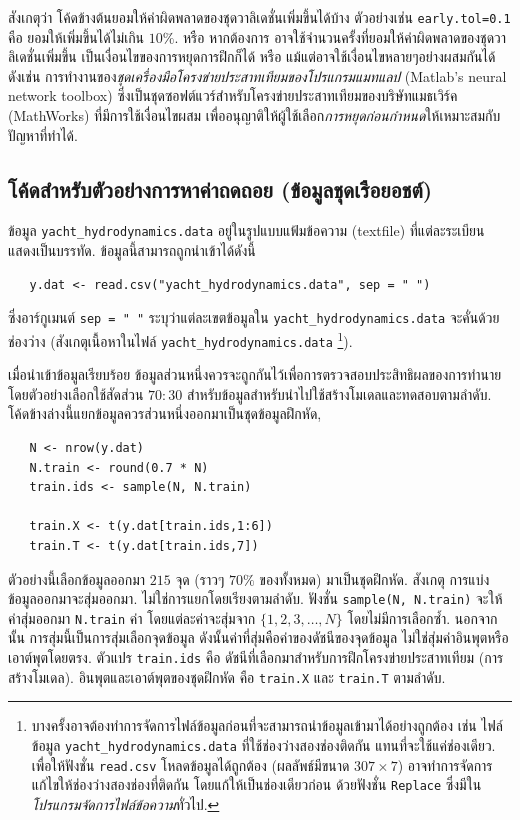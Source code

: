 สังเกตุว่า โค้ดข้างต้นยอมให้ค่าผิดพลาดของชุดวาลิเดชั่นเพิ่มขึ้นได้บ้าง
ตัวอย่างเช่น \texttt{early.tol=0.1} คือ ยอมให้เพิ่มขึ้นได้ไม่เกิน $10\%$.
หรือ หากต้องการ อาจใช้จำนวนครั้งที่ยอมให้ค่าผิดพลาดของชุดวาลิเดชั่นเพิ่มขึ้น เป็นเงื่อนไขของการหยุดการฝึกก็ได้ 
หรือ แม้แต่อาจใช้เงื่อนไขหลายๆอย่างผสมกันได้ ดังเช่น การทำงานของ\textit{ชุดเครื่องมือโครงข่ายประสาทเทียมของโปรแกรมแมทแลป} (Matlab's neural network toolbox) ซึ่งเป็นชุดซอฟต์แวร์สำหรับโครงข่ายประสาทเทียมของบริษัทแมธเวิร์ค (MathWorks) ที่มีการใช้เงื่อนไขผสม 
เพื่ออนุญาติให้ผู้ใช้เลือก\textit{การหยุดก่อนกำหนด}ให้เหมาะสมกับปัญหาที่ทำได้.

\subsection{โค้ดสำหรับตัวอย่างการหาค่าถดถอย (ข้อมูลชุดเรือยอชต์)}
\label{sec: regression example code}

ข้อมูล \texttt{yacht\_hydrodynamics.data} อยู่ในรูปแบบแฟ้มข้อความ (textfile) 
ที่แต่ละระเบียนแสดงเป็นบรรทัด.
ข้อมูลนี้สามารถถูกนำเข้าได้ดังนี้
\begin{verbatim}
   y.dat <- read.csv("yacht_hydrodynamics.data", sep = " ")
\end{verbatim}
ซึ่งอาร์กูเมนต์ \texttt{sep = " "} ระบุว่าแต่ละเขตข้อมูลใน \texttt{yacht\_hydrodynamics.data} จะคั่นด้วยช่องว่าง (สังเกตุเนื้อหาในไฟล์ \texttt{yacht\_hydrodynamics.data}%
\footnote{%
บางครั้งอาจต้องทำการจัดการไฟล์ข้อมูลก่อนที่จะสามารถนำข้อมูลเข้ามาได้อย่างถูกต้อง
เช่น ไฟล์ข้อมูล \texttt{yacht\_hydrodynamics.data} ที่ใช้ช่องว่างสองช่องติดกัน แทนที่จะใช้แค่ช่องเดียว.
เพื่อให้ฟังชั่น \texttt{read.csv} โหลดข้อมูลได้ถูกต้อง (ผลลัพธ์มีขนาด $307 \times 7$)
อาจทำการจัดการแก้ไขให้ช่องว่างสองช่องที่ติดกัน โดยแก้ให้เป็นช่องเดียวก่อน ด้วยฟังชั่น \texttt{Replace} ซึ่งมีใน\textit{โปรแกรมจัดการไฟล์ข้อความ}ทั่วไป.
}).

เมื่อนำเข้าข้อมูลเรียบร้อย ข้อมูลส่วนหนึ่งควรจะถูกกันไว้เพื่อการตรวจสอบประสิทธิผลของการทำนาย 
โดยตัวอย่างเลือกใช้สัดส่วน $70:30$ สำหรับข้อมูลสำหรับนำไปใช้สร้างโมเดลและทดสอบตามลำดับ.
โค้ดข้างล่างนี้แยกข้อมูลควรส่วนหนึ่งออกมาเป็นชุดข้อมูลฝึกหัด,
\begin{verbatim}
   N <- nrow(y.dat)
   N.train <- round(0.7 * N)
   train.ids <- sample(N, N.train)

   train.X <- t(y.dat[train.ids,1:6])
   train.T <- t(y.dat[train.ids,7])
\end{verbatim}
ตัวอย่างนี้เลือกข้อมูลออกมา $215$ จุด (ราวๆ $70\%$ ของทั้งหมด) มาเป็นชุดฝึกหัด.
สังเกตุ การแบ่งข้อมูลออกมาจะสุ่มออกมา. ไม่ใช่การแยกโดยเรียงตามลำดับ.
ฟังชั่น \texttt{sample(N, N.train)} จะให้ค่าสุ่มออกมา \texttt{N.train} ค่า โดยแต่ละค่าจะสุ่มจาก $\{1, 2, 3, \ldots, N \}$ โดยไม่มีการเลือกซ้ำ.
นอกจากนั้น การสุ่มนี้เป็นการสุ่มเลือกจุดข้อมูล ดังนั้นค่าที่สุ่มคือค่าของดัชนีของจุดข้อมูล ไม่ใช่สุ่มค่าอินพุตหรือเอาต์พุตโดยตรง.
ตัวแปร \texttt{train.ids} คือ ดัชนีที่เลือกมาสำหรับการฝึกโครงข่ายประสาทเทียม (การสร้างโมเดล). 
อินพุตและเอาต์พุตของชุดฝึกหัด คือ \texttt{train.X} และ \texttt{train.T} ตามลำดับ.

